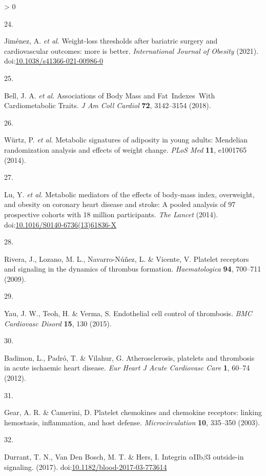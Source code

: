 \documentclass[11pt,twoside]{bristolthesis}
\newlength{\cslhangindent}
\newlength{\csllabelwidth}
\newenvironment{CSLReferences}[2] %
 {%
  \setlength{\parindent}{0pt}
  \ifodd #1 \everypar{\setlength{\hangindent}{\cslhangindent}}\ignorespaces\fi
  \ifnum #2 > 0
  \setlength{\parskip}{#2\baselineskip}
  \fi
 }%
 {}
\newcommand{\CSLLeftMargin}[1]{\parbox[t]{\csllabelwidth}{#1}}
\newcommand{\CSLRightInline}[1]{\parbox[t]{\linewidth - \csllabelwidth}{#1}\break}
\begin{document}
\begin{CSLReferences}{0}{0}
\leavevmode\hypertarget{ref-Jimenez2021}{}%
\CSLLeftMargin{24. }
\CSLRightInline{Jiménez, A. \emph{et al.} {Weight-loss thresholds after bariatric surgery and cardiovascular outcomes: more is better}. \emph{International Journal of Obesity} (2021). doi:\href{https://doi.org/10.1038/s41366-021-00986-0}{10.1038/s41366-021-00986-0}}

\leavevmode\hypertarget{ref-Bell2018a}{}%
\CSLLeftMargin{25. }
\CSLRightInline{Bell, J. A. \emph{et al.} {Associations of Body Mass and Fat~Indexes~With Cardiometabolic Traits}. \emph{J Am Coll Cardiol} \textbf{72}, 3142--3154 (2018).}

\leavevmode\hypertarget{ref-Wurtz2014}{}%
\CSLLeftMargin{26. }
\CSLRightInline{Würtz, P. \emph{et al.} {Metabolic signatures of adiposity in young adults: Mendelian randomization analysis and effects of weight change}. \emph{PLoS Med} \textbf{11}, e1001765 (2014).}

\leavevmode\hypertarget{ref-Lu2014}{}%
\CSLLeftMargin{27. }
\CSLRightInline{Lu, Y. \emph{et al.} {Metabolic mediators of the effects of body-mass index, overweight, and obesity on coronary heart disease and stroke: A pooled analysis of 97 prospective cohorts with 1{{}}8 million participants}. \emph{The Lancet} (2014). doi:\href{https://doi.org/10.1016/S0140-6736(13)61836-X}{10.1016/S0140-6736(13)61836-X}}

\leavevmode\hypertarget{ref-Rivera2009}{}%
\CSLLeftMargin{28. }
\CSLRightInline{Rivera, J., Lozano, M. L., Navarro-Núñez, L. \& Vicente, V. {Platelet receptors and signaling in the dynamics of thrombus formation}. \emph{Haematologica} \textbf{94}, 700--711 (2009).}

\leavevmode\hypertarget{ref-Yau2015}{}%
\CSLLeftMargin{29. }
\CSLRightInline{Yau, J. W., Teoh, H. \& Verma, S. {Endothelial cell control of thrombosis}. \emph{BMC Cardiovasc Disord} \textbf{15}, 130 (2015).}

\leavevmode\hypertarget{ref-Badimon2012}{}%
\CSLLeftMargin{30. }
\CSLRightInline{Badimon, L., Padró, T. \& Vilahur, G. {Atherosclerosis, platelets and thrombosis in acute ischaemic heart disease}. \emph{Eur Heart J Acute Cardiovasc Care} \textbf{1}, 60--74 (2012).}

\leavevmode\hypertarget{ref-Gear2003}{}%
\CSLLeftMargin{31. }
\CSLRightInline{Gear, A. R. \& Camerini, D. {Platelet chemokines and chemokine receptors: linking hemostasis, inflammation, and host defense}. \emph{Microcirculation} \textbf{10}, 335--350 (2003).}

\leavevmode\hypertarget{ref-Durrant2017a}{}%
\CSLLeftMargin{32. }
\CSLRightInline{Durrant, T. N., Van Den Bosch, M. T. \& Hers, I. {Integrin \(\alpha\)IIb\(\beta\)3 outside-in signaling}. (2017). doi:\href{https://doi.org/10.1182/blood-2017-03-773614}{10.1182/blood-2017-03-773614}}


\end{CSLReferences}
\end{document}
